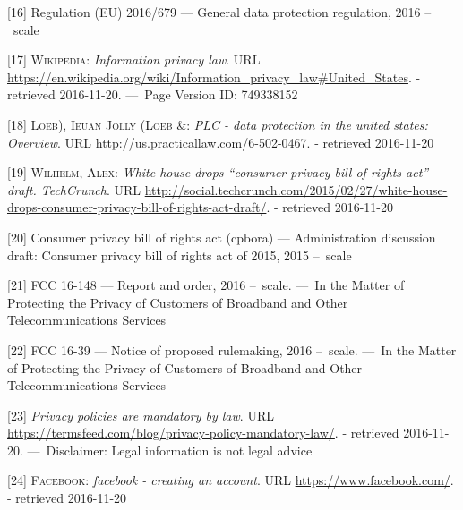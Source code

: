 \documentclass[12pt,english,a4paper,titlepage,cleardoublepage=empty,dottedtoc]{report}
\begin{document}
\hypertarget{ref-regulation_2016_eu_general-data-protection-regulation_definition}{}
{[}16{]} Regulation (EU) 2016/679 --- General data protection
regulation, 2016 --~scale

\hypertarget{ref-web_2016_wikipedia_information-privacy-law_us}{}
{[}17{]} \textsc{Wikipedia}: \emph{Information privacy law}. URL
\url{https://en.wikipedia.org/wiki/Information_privacy_law\#United_States}.
- retrieved 2016-11-20. ---~Page Version ID: 749338152

\hypertarget{ref-web_2016_data-protection-laws-in-the-us}{}
{[}18{]} \textsc{Loeb), Ieuan Jolly (Loeb \&}: \emph{PLC - data
protection in the united states: Overview}. URL
\url{http://us.practicallaw.com/6-502-0467}. - retrieved 2016-11-20

\hypertarget{ref-web_2015_white-house-releases-consumer-privacy-bill-draft}{}
{[}19{]} \textsc{Wilhelm, Alex}: \emph{White house drops ``consumer
privacy bill of rights act'' draft. TechCrunch}. URL
\url{http://social.techcrunch.com/2015/02/27/white-house-drops-consumer-privacy-bill-of-rights-act-draft/}.
- retrieved 2016-11-20

\hypertarget{ref-bill-draft_2015_us_consumer-privacy-bill-of-rights-act_definition}{}
{[}20{]} Consumer privacy bill of rights act (cpbora) --- Administration
discussion draft: Consumer privacy bill of rights act of 2015, 2015
--~scale

\hypertarget{ref-rules_2016_fcc_to-protect-broadband-consumer-privacy_sensitive-types-of-data}{}
{[}21{]} FCC 16-148 --- Report and order, 2016 --~scale. ---~In the
Matter of Protecting the Privacy of Customers of Broadband and Other
Telecommunications Services

\hypertarget{ref-rules_2016_fcc_to-protect-broadband-consumer-privacy_personally-identifiable-information}{}
{[}22{]} FCC 16-39 --- Notice of proposed rulemaking, 2016 --~scale.
---~In the Matter of Protecting the Privacy of Customers of Broadband
and Other Telecommunications Services

\hypertarget{ref-web_2016_privacy-policies-are-mandatory-by-law}{}
{[}23{]} \emph{Privacy policies are mandatory by law}. URL
\url{https://termsfeed.com/blog/privacy-policy-mandatory-law/}. -
retrieved 2016-11-20. ---~Disclaimer: Legal information is not legal
advice

\hypertarget{ref-web_2016_facebooks-landing-page_policy-acknowledgement}{}
{[}24{]} \textsc{Facebook}: \emph{facebook - creating an account}. URL
\url{https://www.facebook.com/}. - retrieved 2016-11-20
\end{document}

